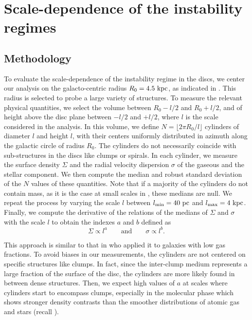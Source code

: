 \documentclass[useAMS,usenatbib]{mnras}
\begin{document}
\section{Scale-dependence of the instability regimes}
\label{sec:scale}

\subsection{Methodology}
\label{sec:instamethod}

To evaluate the scale-dependence of the instability regime in the discs, we center our analysis on the galacto-centric radius $R_0 = 4.5 \mathrm{~kpc}$, as indicated in . This radius is selected to probe a large variety of structures. To measure the relevant physical quantities, we select the volume between $R_0 - l/2$ and $R_0 + l/2$, and of height above the disc plane between $-l/2$ and $+l/2$, where $l$ is the scale considered in the analysis. In this volume, we define $N = \lfloor 2\pi R_0 / l \rfloor$ cylinders of diameter $l$ and height $l$, with their centers uniformly distributed in azimuth along the galactic circle of radius $R_0$. The cylinders do not necessarily coincide with sub-structures in the discs like clumps or spirals. In each cylinder, we measure the surface density $\Sigma$ and the radial velocity dispersion $\sigma$ of the gaseous and the stellar component. We then compute the median and robust standard deviation of the $N$ values of these quantities. Note that if a majority of the cylinders do not contain mass, as it is the case at small scales in \htwo, these medians are null. We repeat the process by varying the scale $l$ between $l_{\rm min} = 40 \mathrm{~pc}$ and $l_{\rm max} = 4 \mathrm{~kpc}$. Finally, we compute the derivative of the relations of the medians of $\Sigma$ and $\sigma$ with the scale $l$ to obtain the indexes $a$ and $b$ defined as 
\begin{equation}
\label{eqn:ab}
\Sigma \propto l^a \qquad \textrm{and} \qquad  \sigma \propto l^b.
\end{equation}

This approach is similar to that in \citet{Agertz2015b} who applied it to galaxies with low gas fractions. To avoid biases in our measurements, the cylinders are not centered on specific structures like clumps. In fact, since the inter-clump medium represents a large fraction of the surface of the disc, the cylinders are more likely found in between dense structures. Then, we expect high values of $a$ at scales where cylinders start to encompass clumps, especially in the molecular phase which shows stronger density contrasts than the smoother distributions of atomic gas and stars (recall ).
\end{document}
